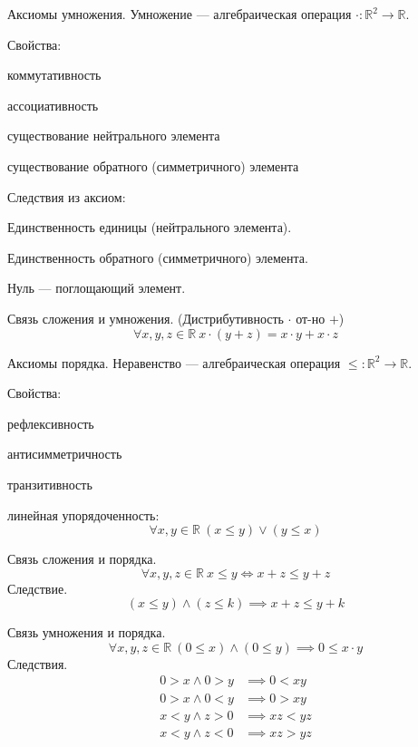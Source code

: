 \begin{theorem}
{\bold Аксиомы умножения.} {\ital Умножение} --- алгебраическая операция $\cdot\colon\mathbb{R}^2\to\mathbb{R}$.

Свойства:
\begin{list*}[][\#]
\item коммутативность
\item ассоциативность
\item существование нейтрального элемента
\item существование обратного {\ital (симметричного)} элемента
\end{list*}
Следствия из аксиом:
\begin{list*}[][\#]
\item Единственность единицы {\ital (нейтрального элемента)}.
\item Единственность обратного {\ital (симметричного)} элемента.
\item Нуль --- поглощающий элемент.
\end{list*}
\end{theorem}

\begin{theorem}
{\bold Связь сложения и умножения.} {\ital\color{desc} (Дистрибутивность $\cdot$ от-но $+$)}
$$\forall x,y,z\in\mathbb{R}\ x\cdot(y+z)=x\cdot y+x\cdot z$$
\end{theorem}

\begin{theorem}
{\bold Аксиомы порядка.} {\ital Неравенство} --- алгебраическая операция $\leq\colon\mathbb{R}^2\to\mathbb{R}$.

Свойства:
\begin{list*}[][\#]
\item рефлексивность
\item антисимметричность
\item транзитивность
\item {\ital линейная упорядоченность:}
$$\forall x,y\in\mathbb{R}\ (x\leq y)\lor(y\leq x)$$
\end{list*}
\end{theorem}

\begin{theorem}
{\bold Связь сложения и порядка.}
$$\forall x,y,z\in\mathbb{R}\ x\leq y\iff x+z\leq y+z$$
{\bold Следствие.}
$$(x\leq y)\land(z\leq k)\implies x+z\leq y+k$$
\end{theorem}

\begin{theorem}
{\bold Связь умножения и порядка.}
$$\forall x,y,z\in\mathbb{R}\ (0\leq x)\land(0\leq y)\implies 0\leq x\cdot y$$
{\bold Следствия.}
$$\begin{aligned}
0\greater x\land 0\greater y&\implies 0\less xy\\
0\greater x\land 0\less y&\implies 0\greater xy\\
x\less y\land z\greater 0&\implies xz\less yz\\
x\less y\land z\less 0&\implies xz\greater yz
\end{aligned}$$
\end{theorem}

